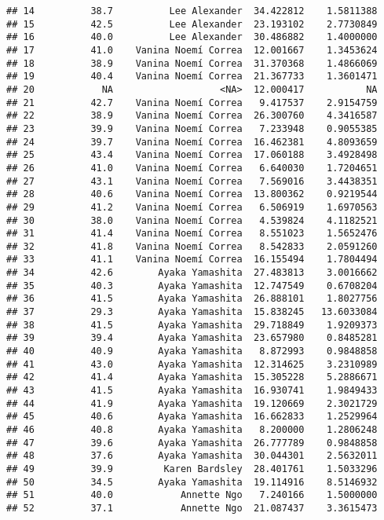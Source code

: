\documentclass[]{article}
\begin{document}
\begin{verbatim}
## 14          38.7          Lee Alexander  34.422812    1.5811388
## 15          42.5          Lee Alexander  23.193102    2.7730849
## 16          40.0          Lee Alexander  30.486882    1.4000000
## 17          41.0    Vanina Noemí Correa  12.001667    1.3453624
## 18          38.9    Vanina Noemí Correa  31.370368    1.4866069
## 19          40.4    Vanina Noemí Correa  21.367733    1.3601471
## 20            NA                   <NA>  12.000417           NA
## 21          42.7    Vanina Noemí Correa   9.417537    2.9154759
## 22          38.9    Vanina Noemí Correa  26.300760    4.3416587
## 23          39.9    Vanina Noemí Correa   7.233948    0.9055385
## 24          39.7    Vanina Noemí Correa  16.462381    4.8093659
## 25          43.4    Vanina Noemí Correa  17.060188    3.4928498
## 26          41.0    Vanina Noemí Correa   6.640030    1.7204651
## 27          43.1    Vanina Noemí Correa   7.569016    3.4438351
## 28          40.6    Vanina Noemí Correa  13.800362    0.9219544
## 29          41.2    Vanina Noemí Correa   6.506919    1.6970563
## 30          38.0    Vanina Noemí Correa   4.539824    4.1182521
## 31          41.4    Vanina Noemí Correa   8.551023    1.5652476
## 32          41.8    Vanina Noemí Correa   8.542833    2.0591260
## 33          41.1    Vanina Noemí Correa  16.155494    1.7804494
## 34          42.6        Ayaka Yamashita  27.483813    3.0016662
## 35          40.3        Ayaka Yamashita  12.747549    0.6708204
## 36          41.5        Ayaka Yamashita  26.888101    1.8027756
## 37          29.3        Ayaka Yamashita  15.838245   13.6033084
## 38          41.5        Ayaka Yamashita  29.718849    1.9209373
## 39          39.4        Ayaka Yamashita  23.657980    0.8485281
## 40          40.9        Ayaka Yamashita   8.872993    0.9848858
## 41          43.0        Ayaka Yamashita  12.314625    3.2310989
## 42          41.4        Ayaka Yamashita  15.305228    5.2886671
## 43          41.5        Ayaka Yamashita  16.930741    1.9849433
## 44          41.9        Ayaka Yamashita  19.120669    2.3021729
## 45          40.6        Ayaka Yamashita  16.662833    1.2529964
## 46          40.8        Ayaka Yamashita   8.200000    1.2806248
## 47          39.6        Ayaka Yamashita  26.777789    0.9848858
## 48          37.6        Ayaka Yamashita  30.044301    2.5632011
## 49          39.9         Karen Bardsley  28.401761    1.5033296
## 50          34.5        Ayaka Yamashita  19.114916    8.5146932
## 51          40.0            Annette Ngo   7.240166    1.5000000
## 52          37.1            Annette Ngo  21.087437    3.3615473

\end{verbatim}
\end{document}
